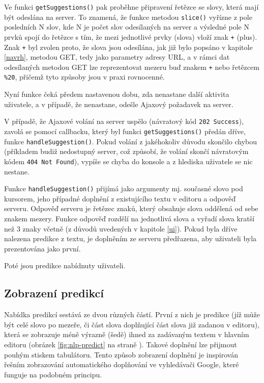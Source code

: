 \documentclass[a4paper,11pt]{article}
\begin{document}
Ve funkci {\tt getSuggestions()} pak proběhne připravení řetězce se slovy, která mají být odeslána na server. To znamená, že funkce metodou {\tt slice()} vyřízne z pole posledních N slov, kde N je počet slov odesílaných na server a výsledné pole N prvků spojí do řetězce s tím, že mezi jednotlivé prvky (slova) vloží znak {\tt +} (plus). Znak {\tt +} byl zvolen proto, že slova jsou odesílána, jak již bylo popsáno v kapitole \ref{navrh}, metodou GET, tedy jako parametry adresy URL, a v rámci dat odesílaných metodou GET lze reprezentovat mezeru buď znakem {\tt +} nebo řetězcem {\tt \%20}, přičemž tyto způsoby jsou v praxi rovnocenné.

Nyní funkce čeká předem nastavenou dobu, zda nenastane další aktivita uživatele, a v případě, že nenastane, odešle Ajaxový požadavek na server.

V případě, že Ajaxové volání na server uspělo (návratový kód {\tt 202 Success}), zavolá se pomocí callbacku, který byl funkci {\tt getSuggestions()} předán dříve, funkce {\tt handleSuggestion()}. Pokud volání z jakéhokoliv důvodu skončilo chybou (příkladem budiž nedostupný server, což způsobí, že volání skončí návratovým kódem {\tt 404 Not Found}), vypíše se chyba do konsole a z hlediska uživatele se nic nestane. 

Funkce {\tt handleSuggestion()} přijímá jako argumenty mj. současné slovo pod kursorem, jeho případné doplnění z existujícího textu v editoru a odpověď serveru. Odpověď serveru je řetězec znaků, který obsahuje slova oddělená od sebe znakem mezery. Funkce odpověď rozdělí na jednotlivá slova a vyřadí slova kratší než 3 znaky včetně (z důvodů uvedených v kapitole \ref{ui}). Pokud byla dříve nalezena predikce z textu, je doplněním ze serveru předřazena, aby uživateli byla prezentována jako první.

Poté jsou predikce nabídnuty uživateli.

\subsection{Zobrazení predikcí}

Nabídka predikcí sestává ze dvou různých částí. První z nich je predikce (jíž může být celé slovo po mezeře, či část slova doplňující část slova již zadanou v editoru), která se zobrazuje méně výrazně (šedě) ihned za zadávaným textem v hlavním editoru (obrázek \ref{fig:nlp-predict} na straně \pageref{fig:nlp-predict}). Takové doplnění lze přijmout pouhým stiskem tabulátoru. Tento způsob zobrazení doplnění je inspirován řešním zobrazování automatického doplňování ve vyhledávači Google, které funguje na podobném principu. 
\end{document}
